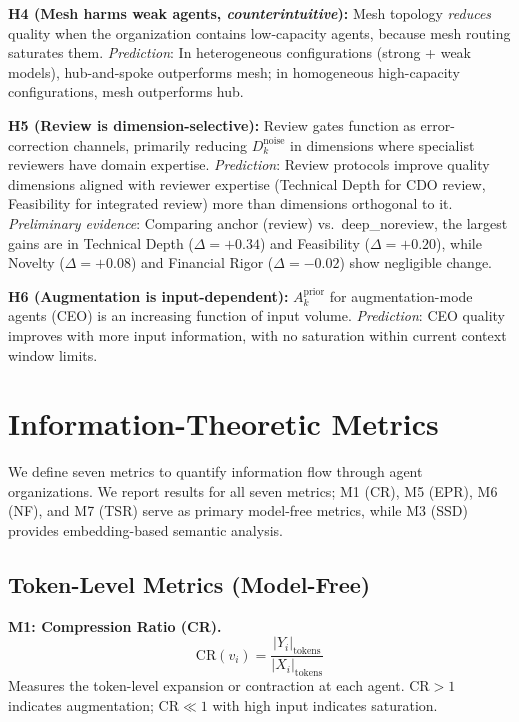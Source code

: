 \documentclass[conference]{IEEEtran}
\begin{document}
\textbf{H4 (Mesh harms weak agents, \emph{counterintuitive}):}
Mesh topology \emph{reduces} quality when the organization contains low-capacity agents, because mesh routing saturates them.
\emph{Prediction}: In heterogeneous configurations (strong + weak models), hub-and-spoke outperforms mesh; in homogeneous high-capacity configurations, mesh outperforms hub.

\textbf{H5 (Review is dimension-selective):}
Review gates function as error-correction channels, primarily reducing $D_k^{\text{noise}}$ in dimensions where specialist reviewers have domain expertise.
\emph{Prediction}: Review protocols improve quality dimensions aligned with reviewer expertise (Technical Depth for CDO review, Feasibility for integrated review) more than dimensions orthogonal to it.
\emph{Preliminary evidence}: Comparing anchor (review) vs.\ deep\_noreview, the largest gains are in Technical Depth ($\Delta = +0.34$) and Feasibility ($\Delta = +0.20$), while Novelty ($\Delta = +0.08$) and Financial Rigor ($\Delta = -0.02$) show negligible change.

\textbf{H6 (Augmentation is input-dependent):}
$A_k^{\text{prior}}$ for augmentation-mode agents (CEO) is an increasing function of input volume.
\emph{Prediction}: CEO quality improves with more input information, with no saturation within current context window limits.

\section{Information-Theoretic Metrics}
\label{sec:metrics}

We define seven metrics to quantify information flow through agent organizations.
We report results for all seven metrics; M1 (CR), M5 (EPR), M6 (NF), and M7 (TSR) serve as primary model-free metrics, while M3 (SSD) provides embedding-based semantic analysis.

\subsection{Token-Level Metrics (Model-Free)}

\textbf{M1: Compression Ratio (CR).}
\begin{equation}
    \text{CR}(v_i) = \frac{|Y_i|_{\text{tokens}}}{|X_i|_{\text{tokens}}}
\end{equation}
Measures the token-level expansion or contraction at each agent.
$\text{CR} > 1$ indicates augmentation; $\text{CR} \ll 1$ with high input indicates saturation.
\end{document}
